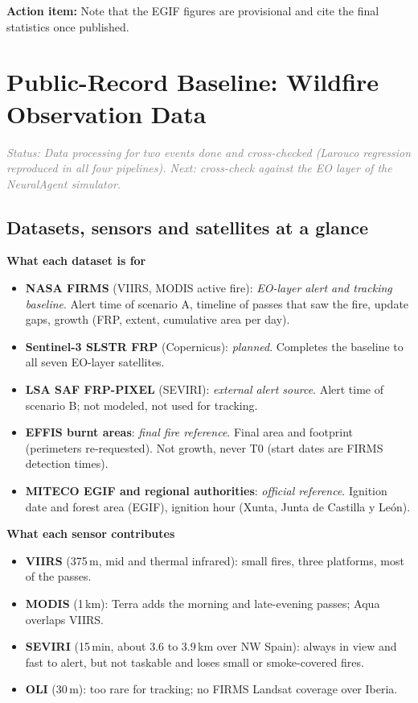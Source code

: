 \documentclass[11pt]{article}
\newcommand{\actionitem}[1]{\textcolor{todo}{\textbf{Action item:}} #1}
\newcommand{\status}[1]{\textit{\textcolor{gray}{Status: #1}}}
\begin{document}
\actionitem{Note that the EGIF figures are provisional and cite the final statistics once published.}


\section{Public-Record Baseline: Wildfire Observation Data} \label{sec:public_record}

\status{Data processing for two events done and cross-checked (Larouco regression reproduced in all four pipelines). Next: cross-check against the EO layer of the NeuralAgent simulator.}

\subsection{Datasets, sensors and satellites at a glance}
\label{subsec:datasets_glance}

\textbf{What each dataset is for}
\begin{itemize}
  \item \textbf{NASA FIRMS} (VIIRS, MODIS active fire): \emph{EO-layer alert and tracking baseline}. Alert time of scenario A, timeline of passes that saw the fire, update gaps, growth (FRP, extent, cumulative area per day).
  \item \textbf{Sentinel-3 SLSTR FRP} (Copernicus): \emph{planned}. Completes the baseline to all seven EO-layer satellites.
  \item \textbf{LSA SAF FRP-PIXEL} (SEVIRI): \emph{external alert source}. Alert time of scenario B; not modeled, not used for tracking.
  \item \textbf{EFFIS burnt areas}: \emph{final fire reference}. Final area and footprint (perimeters re-requested). Not growth, never T0 (start dates are FIRMS detection times).
  \item \textbf{MITECO EGIF and regional authorities}: \emph{official reference}. Ignition date and forest area (EGIF), ignition hour (Xunta, Junta de Castilla y Le\'on).
\end{itemize}

\textbf{What each sensor contributes}
\begin{itemize}
  \item \textbf{VIIRS} (375\,m, mid and thermal infrared): small fires, three platforms, most of the passes.
  \item \textbf{MODIS} (1\,km): Terra adds the morning and late-evening passes; Aqua overlaps VIIRS.
  \item \textbf{SEVIRI} (15\,min, about 3.6 to 3.9\,km over NW Spain): always in view and fast to alert, but not taskable and loses small or smoke-covered fires.
  \item \textbf{OLI} (30\,m): too rare for tracking; no FIRMS Landsat coverage over Iberia.
\end{itemize}
\end{document}
